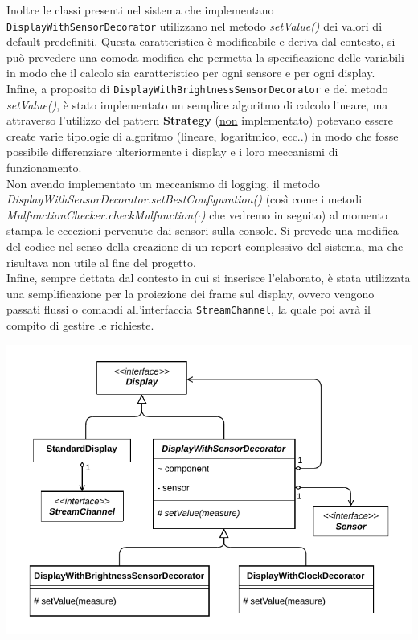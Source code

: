 \documentclass[a4paper,11pt]{article}
\begin{document}
	Inoltre le classi presenti nel sistema che implementano \texttt{DisplayWithSensorDecorator} utilizzano nel metodo \textit{setValue()} dei valori di default predefiniti. Questa caratteristica è modificabile e deriva dal contesto, si può prevedere una comoda modifica che permetta la specificazione delle variabili in modo che il calcolo sia caratteristico per ogni sensore e per ogni display.\\
	Infine, a proposito di \texttt{DisplayWithBrightnessSensorDecorator} e del metodo \textit{setValue()}, è stato implementato un semplice algoritmo di calcolo lineare, ma attraverso l'utilizzo del pattern \textbf{Strategy} (\underline{non} implementato) potevano essere create varie tipologie di algoritmo (lineare, logaritmico, ecc..) in modo che fosse possibile differenziare ulteriormente i display e i loro meccanismi di funzionamento.\\
	Non avendo implementato un meccanismo di logging, il metodo \textit{DisplayWithSensorDecorator.setBestConfiguration()} (così come i metodi \textit{MulfunctionChecker.checkMulfunction($\cdot$)} che vedremo in seguito) al momento stampa le eccezioni pervenute dai sensori sulla console. Si prevede una modifica del codice nel senso della creazione di un report complessivo del sistema, ma che risultava non utile al fine del progetto.\\
	Infine, sempre dettata dal contesto in cui si inserisce l'elaborato, è stata utilizzata una semplificazione per la proiezione dei frame sul display, ovvero vengono passati flussi o comandi all'interfaccia \texttt{StreamChannel}, la quale poi avrà il compito di gestire le richieste.\\
	\begin{minipage}[c]{\textwidth}
		\centering
		\includegraphics[width=.5\textwidth]{diagramma/ClassDiagramm-DisplayHierarchy.pdf}
		\label{fig:display}
	\end{minipage}	
	
\end{document}
